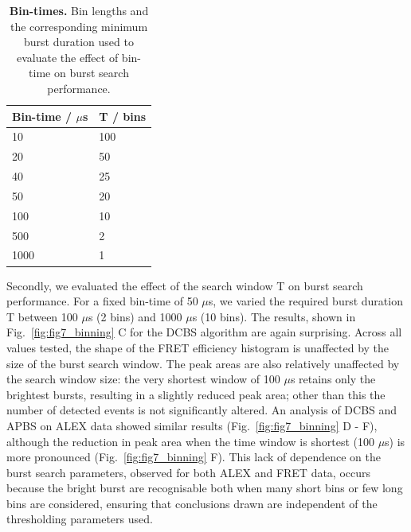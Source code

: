 \begin{table}[!ht]
\caption{
{\bf{Bin-times}.} Bin lengths and the corresponding minimum burst duration used to evaluate the effect of bin-time on burst search performance.}
\begin{tabular}{|l|l|}
\hline
Bin-time / $\mu$s & T / bins \\
\hline
10 & 100 \\
20 & 50 \\
40 & 25 \\
50 & 20 \\
100 & 10 \\
500 & 2 \\
1000 & 1\\
\hline
\end{tabular}

\label{tab:bin-times}
\end{table}

Secondly, we evaluated the effect of the search window T on burst search performance. For a fixed bin-time of 50 $\mu$s, we varied the required burst duration T between 100 $\mu$s (2 bins) and 1000 $\mu$s (10 bins). The results, shown in Fig.~\ref{fig:fig7_binning} C for the DCBS algorithm are again surprising. Across all values tested, the shape of the FRET efficiency histogram is unaffected by the size of the burst search window. The peak areas are also relatively unaffected by the search window size: the very shortest window of 100 $\mu$s retains only the brightest bursts, resulting in a slightly reduced peak area; other than this the number of detected events is not significantly altered. An analysis of DCBS and APBS on ALEX data showed similar results (Fig.~\ref{fig:fig7_binning} D - F), although the reduction in peak area when the time window is shortest (100 $\mu$s) is more pronounced (Fig.~\ref{fig:fig7_binning} F). This lack of dependence on the burst search parameters, observed for both ALEX and FRET data, occurs because the bright burst are recognisable both when many short bins or few long bins are considered, ensuring that conclusions drawn are independent of the thresholding parameters used.

